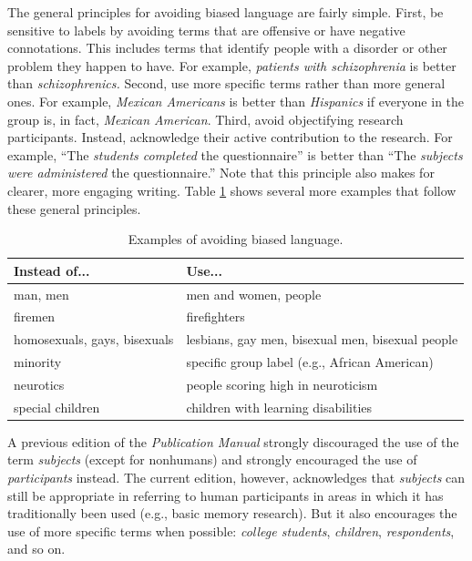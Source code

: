 \documentclass[
]{krantz}
\begin{document}
The general principles for avoiding biased language are fairly simple. First, be sensitive to labels by avoiding terms that are offensive or have negative connotations. This includes terms that identify people with a disorder or other problem they happen to have. For example, \emph{patients with schizophrenia} is better than \emph{schizophrenics.} Second, use more specific terms rather than more general ones. For example, \emph{Mexican Americans} is better than \emph{Hispanics} if everyone in the group is, in fact, \emph{Mexican American}. Third, avoid objectifying research participants. Instead, acknowledge their active contribution to the research. For example, ``The \emph{students completed} the questionnaire'' is better than ``The \emph{subjects were administered} the questionnaire.'' Note that this principle also makes for clearer, more engaging writing. Table \ref{tab:bias} shows several more examples that follow these general principles.

\begin{table}

\caption{\label{tab:bias}Examples of avoiding biased language.}
\centering
\begin{tabular}[t]{l|l}
\hline
Instead of... & Use...\\
\hline
man, men & men and women, people\\
\hline
firemen & firefighters\\
\hline
homosexuals, gays, bisexuals & lesbians, gay men, bisexual men, bisexual people\\
\hline
minority & specific group label (e.g., African American)\\
\hline
neurotics & people scoring high in neuroticism\\
\hline
special children & children with learning disabilities\\
\hline
\end{tabular}
\end{table}

A previous edition of the \emph{Publication Manual} strongly discouraged the use of the term \emph{subjects} (except for nonhumans) and strongly encouraged the use of \emph{participants} instead. The current edition, however, acknowledges that \emph{subjects} can still be appropriate in referring to human participants in areas in which it has traditionally been used (e.g., basic memory research). But it also encourages the use of more specific terms when possible: \emph{college students}, \emph{children}, \emph{respondents}, and so on.
\end{document}
